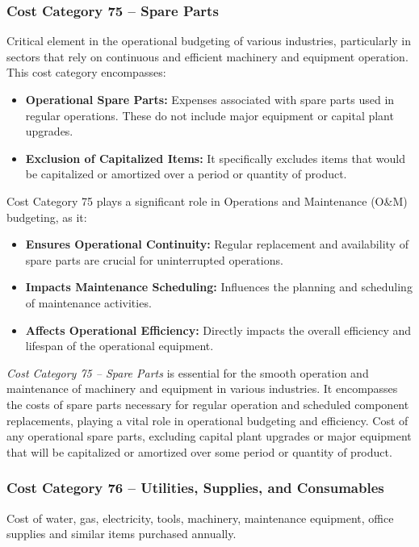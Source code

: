 \subsubsection*{Cost Category 75 – Spare Parts}
Critical element in the operational budgeting of various industries, particularly in sectors that rely on continuous and efficient machinery and equipment operation.  This cost category encompasses:

\begin{itemize}
    \item \textbf{Operational Spare Parts:} Expenses associated with spare parts used in regular operations. These do not include major equipment or capital plant upgrades.
    \item \textbf{Exclusion of Capitalized Items:} It specifically excludes items that would be capitalized or amortized over a period or quantity of product.
\end{itemize}

Cost Category 75 plays a significant role in Operations and Maintenance (O\&M) budgeting, as it:

\begin{itemize}
    \item \textbf{Ensures Operational Continuity:} Regular replacement and availability of spare parts are crucial for uninterrupted operations.
    \item \textbf{Impacts Maintenance Scheduling:} Influences the planning and scheduling of maintenance activities.
    \item \textbf{Affects Operational Efficiency:} Directly impacts the overall efficiency and lifespan of the operational equipment.
\end{itemize}

\textit{Cost Category 75 – Spare Parts} is essential for the smooth operation and maintenance of machinery and equipment in various industries. It encompasses the costs of spare parts necessary for regular operation and scheduled component replacements, playing a vital role in operational budgeting and efficiency.  Cost of any operational spare parts, excluding capital plant upgrades or major equipment that will be capitalized or amortized over some period or quantity of product.

\subsubsection*{Cost Category 76 – Utilities, Supplies, and Consumables}
Cost of water, gas, electricity, tools, machinery, maintenance equipment, office supplies and similar items purchased annually.

